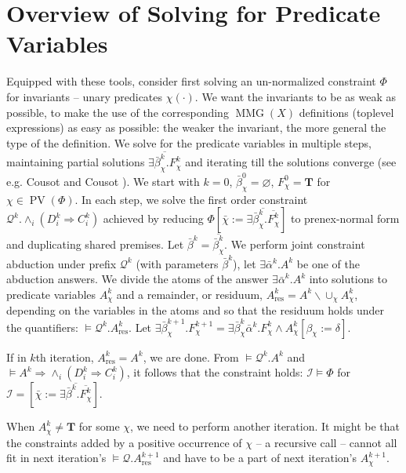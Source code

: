 \documentclass{article}
\newcommand{\assign}{:=}
\newcommand{\cdummy}{\cdot}
\newcommand{\tmmathbf}[1]{\ensuremath{\boldsymbol{#1}}}
\newcommand{\tmop}[1]{\ensuremath{\operatorname{#1}}}
\begin{document}
\section{Overview of Solving for Predicate Variables}\label{PredVarOverview}

Equipped with these tools, consider first solving an un-normalized constraint
$\Phi$ for invariants -- unary predicates $\chi (\cdummy)$. We want the
invariants to be as weak as possible, to make the use of the corresponding
$\tmop{MMG} (X)$ definitions (toplevel expressions) as easy as possible: the
weaker the invariant, the more general the type of the definition. We solve
for the predicate variables in multiple steps, maintaining partial solutions
$\overline{\exists \bar{\beta}^k_{\chi} .F_{\chi}^k}$ and iterating till the
solutions converge (see e.g. Cousot and Cousot {\cite{Cousot77}}). We start
with $k = 0$, $\bar{\beta}^0_{\chi} = \varnothing$, $F^0_{\chi} =\tmmathbf{T}$
for $\chi \in \tmop{PV} (\Phi)$. In each step, we solve the first order
constraint $\mathcal{Q}^k . \wedge_i (D_i^k \Rightarrow C_i^k)$ achieved by
reducing $\Phi \left[ \bar{\chi} \assign \overline{\exists
\bar{\beta}^k_{\chi} . \overline{F^k_{\chi}}} \right]$ to prenex-normal form
and duplicating shared premises. Let $\bar{\beta}^k =
\overline{\bar{\beta}^k_{\chi}}$. We perform joint constraint abduction under
prefix $\mathcal{Q}^k$ (with parameters $\bar{\beta}^k$), let $\exists
\bar{\alpha}^k .A^k$ be one of the abduction answers. We divide the atoms of
the answer $\exists \bar{\alpha}^k .A^k$ into solutions to predicate variables
$A_{\chi}^k$ and a remainder, or residuum, $A_{\tmop{res}}^k = A^k \backslash
\cup_{\chi} A_{\chi}^k$, depending on the variables in the atoms and so that
the residuum holds under the quantifiers: $\vDash \mathcal{Q}^k
.A_{\tmop{res}}^k$. Let $\exists \bar{\beta}^{k + 1}_{\chi} .F^{k + 1}_{\chi}
= \exists \bar{\beta}^k_{\chi} \bar{\alpha}^k .F^k_{\chi} \wedge A^k_{\chi}
[\beta_{\chi} \assign \delta]$.

If in $k$th iteration, $A_{\tmop{res}}^k = A^k$, we are done. From $\vDash
\mathcal{Q}^k .A^k$ and $\vDash A^k \Rightarrow \wedge_i (D_i^k \Rightarrow
C_i^k)$, it follows that the constraint holds: $\mathcal{I} \vDash \Phi$ for
$\mathcal{I}= \left[ \bar{\chi} \assign \overline{\exists \bar{\beta}^k .
\overline{F^k_{\chi}}} \right]$.

When $A^k_{\chi} \neq \tmmathbf{T}$ for some $\chi$, we need to perform
another iteration. It might be that the constraints added by a positive
occurrence of $\chi$ -- a recursive call -- cannot all fit in next iteration's
$\vDash \mathcal{Q}.A_{\tmop{res}}^{k + 1}$ and have to be a part of next
iteration's $A_{\chi}^{k + 1}$.
\end{document}
